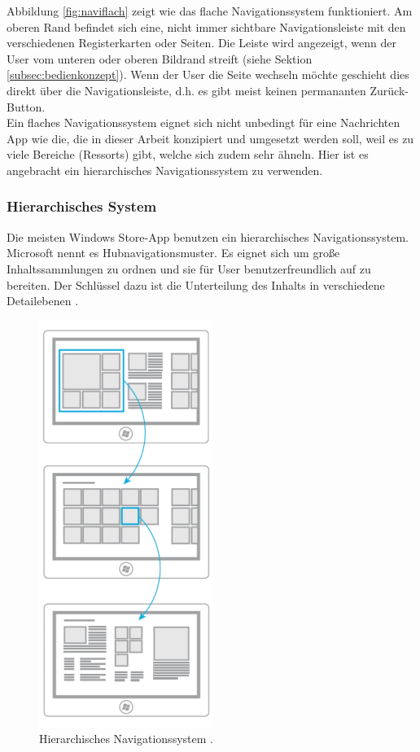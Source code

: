 \documentclass[12pt,a4paper,bibtotoc,abstracton]{scrartcl}
\begin{document}
Abbildung \ref{fig:naviflach} zeigt wie das flache Navigationssystem funktioniert. Am oberen Rand befindet sich eine, nicht immer sichtbare Navigationsleiste mit den verschiedenen Registerkarten oder Seiten. Die Leiste wird angezeigt, wenn der User vom unteren oder oberen Bildrand streift (siehe Sektion \ref{subsec:bedienkonzept}). Wenn der User die Seite wechseln möchte geschieht dies  direkt über die Navigationsleiste, d.h. es gibt meist keinen permananten Zurück-Button. \\
Ein flaches Navigationssystem eignet sich nicht unbedingt für eine Nachrichten App wie die, die in dieser Arbeit konzipiert und umgesetzt werden soll, weil es zu viele Bereiche (Ressorts) gibt, welche sich zudem sehr ähneln. Hier ist es angebracht ein hierarchisches Navigationssystem zu verwenden.    



\subsubsection{Hierarchisches System}
\label{subsubsec:hierachischessystem}
Die meisten Windows Store-App benutzen ein hierarchisches Navigationssystem. Microsoft nennt es Hubnavigationsmuster. Es eignet sich um große Inhaltssammlungen zu ordnen und sie für User benutzerfreundlich auf zu bereiten. Der Schlüssel dazu ist die Unterteilung des Inhalts in verschiedene Detailebenen \citep{MicrosoftNavidesign2013}.

\begin{figure}[h]	
	\centering
	\includegraphics[scale=1]{Bilder/Abbildungen/ms_navigation_hierarchie} 
	\caption{Hierarchisches Navigationssystem \protect\citep{MicrosoftNavidesign2013}.}
	\label{fig:navihierarchisch}
\end{figure}
\end{document}
